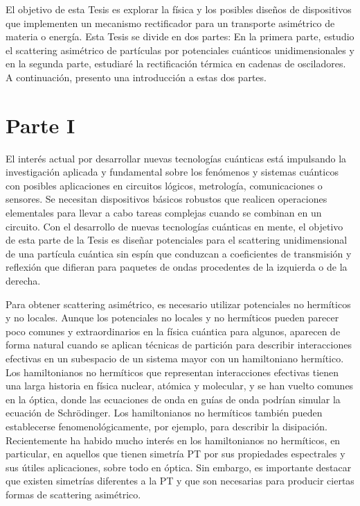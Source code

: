 El objetivo de esta Tesis es explorar la física y los posibles diseños de dispositivos que implementen un mecanismo rectificador para un transporte asimétrico de materia o energía. Esta Tesis se divide en dos partes: En la primera parte, estudio el scattering asimétrico de partículas por potenciales cuánticos unidimensionales y en la segunda parte, estudiaré la rectificación térmica en cadenas de osciladores. A continuación, presento una introducción a estas dos partes.

\section*{Parte I}


El interés actual por desarrollar nuevas tecnologías cuánticas está impulsando la investigación aplicada y fundamental sobre los fenómenos y sistemas cuánticos con posibles aplicaciones en circuitos lógicos, metrología, comunicaciones o sensores. Se necesitan dispositivos básicos robustos que realicen operaciones elementales para llevar a cabo tareas complejas cuando se combinan en un circuito. Con el desarrollo de nuevas tecnologías cuánticas en mente, el objetivo de esta parte de la Tesis es diseñar potenciales para el scattering unidimensional de una partícula cuántica sin espín que conduzcan a coeficientes de transmisión y reflexión que difieran para paquetes de ondas procedentes de la izquierda o de la derecha.


Para obtener scattering asimétrico, es necesario utilizar potenciales no hermíticos y no locales. Aunque los potenciales no locales y no hermíticos pueden parecer poco comunes y extraordinarios en la física cuántica para algunos, aparecen de forma natural cuando se aplican técnicas de partición para describir interacciones efectivas en un subespacio de un sistema mayor con un hamiltoniano hermítico. Los hamiltonianos no hermíticos que representan interacciones efectivas tienen una larga historia en física nuclear, atómica y molecular, y se han vuelto comunes en la óptica, donde las ecuaciones de onda en guías de onda podrían simular la ecuación de Schr\"{o}dinger. Los hamiltonianos no hermíticos también pueden establecerse fenomenológicamente, por ejemplo, para describir la disipación. Recientemente ha habido mucho interés en los hamiltonianos no hermíticos, en particular, en aquellos que tienen simetría PT por sus propiedades espectrales y sus útiles aplicaciones, sobre todo en óptica. Sin embargo, es importante destacar que existen simetrías diferentes a la PT y que son necesarias para producir ciertas formas de scattering asimétrico.

